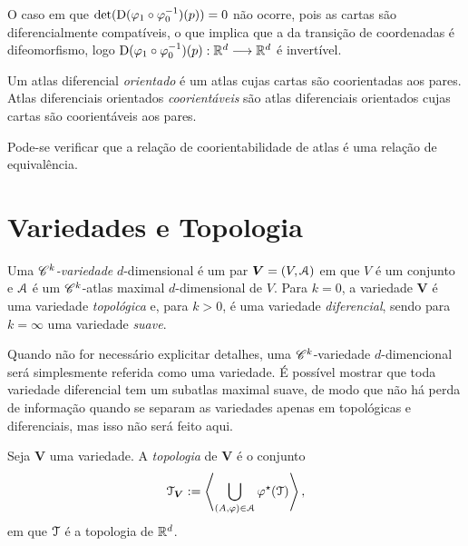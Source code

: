 O caso em que $\det(\mathrm{D}(\varphi_1 \circ \varphi_0^{-1})(p))=0$ não ocorre, pois as cartas são diferencialmente compatíveis, o que implica que a da transição de coordenadas é difeomorfismo, logo $\mathrm{D}(\varphi_1 \circ \varphi_0^{-1})(p): \mathbb{R}^d \longrightarrow \mathbb{R}^d$ é invertível.

\begin{defi}
Um atlas diferencial \emph{orientado} é um atlas cujas cartas são coorientadas aos pares. Atlas diferenciais orientados \emph{coorientáveis} são atlas diferenciais orientados cujas cartas são coorientáveis aos pares.
\end{defi}

Pode-se verificar que a relação de coorientabilidade de atlas é uma relação de equivalência.

\section{Variedades e Topologia}

\begin{defi}
Uma \emph{$\mathscr{C}^k$-variedade} $d$-dimensional é um par $\bm V=(V,\mathcal{A})$ em que $V$ é um conjunto e $\mathcal{A}$ é um $\mathscr{C}^k$-atlas maximal $d$-dimensional de $V$. Para $k=0$, a variedade $\bm V$ é uma variedade \emph{topológica} e, para $k>0$, é uma variedade \emph{diferencial}, sendo para $k=\infty$ uma variedade \emph{suave}.
\end{defi}

Quando não for necessário explicitar detalhes, uma $\mathscr{C}^k$-variedade $d$-dimencional será simplesmente referida como uma variedade. É possível mostrar que toda variedade diferencial tem um subatlas maximal suave, de modo que não há perda de informação quando se separam as variedades apenas em topológicas e diferenciais, mas isso não será feito aqui.


\begin{defi}
Seja $\bm V$ uma variedade. A \emph{topologia} de $\bm V$ é o conjunto
	\begin{equation*}
	\mathcal{T}_{\bm V} := \left\langle \bigcup_{(A,\varphi) \in \mathcal{A}} \varphi^\star(\mathcal{T}) \right\rangle,
	\end{equation*}
em que $\mathcal{T}$ é a topologia de $\mathbb{R}^d$.
\end{defi}

